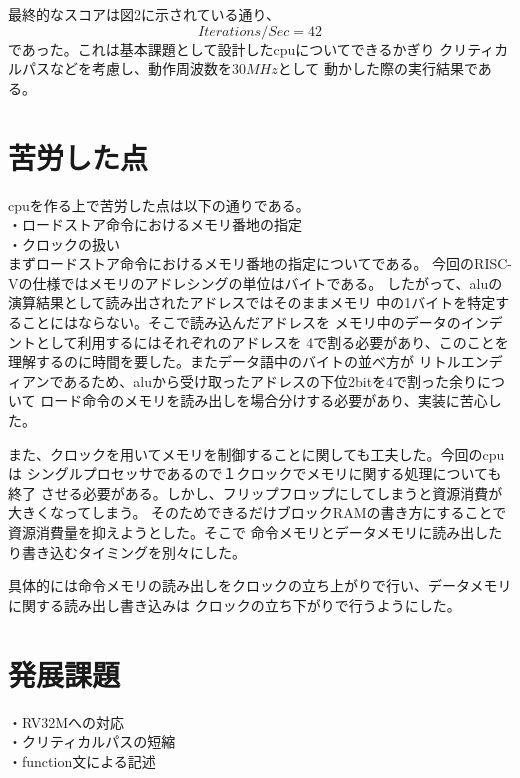 \documentclass[12pt]{jreport}
\begin{document}
  最終的なスコアは図2に示されている通り、
  \begin{equation}Iterations/Sec=42\end{equation}
  であった。これは基本課題として設計したcpuについてできるかぎり
  クリティカルパスなどを考慮し、動作周波数を$30MHz$として
  動かした際の実行結果である。

  \part{苦労した点}
  cpuを作る上で苦労した点は以下の通りである。\\
  ・ロードストア命令におけるメモリ番地の指定\\
  ・クロックの扱い\\ 
  
  まずロードストア命令におけるメモリ番地の指定についてである。
  今回のRISC-Vの仕様ではメモリのアドレシングの単位はバイトである。
  したがって、aluの演算結果として読み出されたアドレスではそのままメモリ
  中の1バイトを特定することにはならない。そこで読み込んだアドレスを
  メモリ中のデータのインデントとして利用するにはそれぞれのアドレスを
  4で割る必要があり、このことを理解するのに時間を要した。またデータ語中のバイトの並べ方が
  リトルエンディアンであるため、aluから受け取ったアドレスの下位2bitを4で割った余りについて
  ロード命令のメモリを読み出しを場合分けする必要があり、実装に苦心した。

  また、クロックを用いてメモリを制御することに関しても工夫した。今回のcpuは
  シングルプロセッサであるので１クロックでメモリに関する処理についても終了
  させる必要がある。しかし、フリップフロップにしてしまうと資源消費が大きくなってしまう。
  そのためできるだけブロックRAMの書き方にすることで資源消費量を抑えようとした。そこで
  命令メモリとデータメモリに読み出したり書き込むタイミングを別々にした。


  具体的には命令メモリの読み出しをクロックの立ち上がりで行い、データメモリに関する読み出し書き込みは
  クロックの立ち下がりで行うようにした。

  \part{発展課題}
  ・RV32Mへの対応\\
  ・クリティカルパスの短縮\\
  ・function文による記述\\
\end{document}
